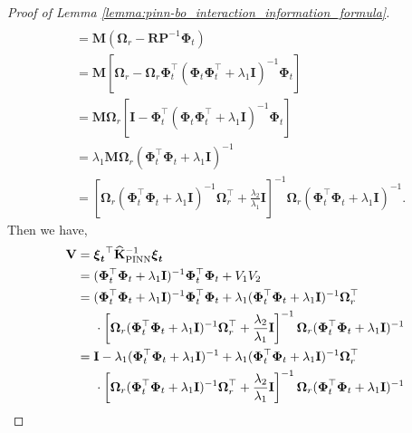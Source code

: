 \begin{proof}[Proof of Lemma \ref{lemma:pinn-bo_interaction_information_formula}]
\begin{align*}
\\
            & = \mathbf{M}(\boldsymbol{\Omega}_r - \mathbf{R}\mathbf{P}^{-1}\boldsymbol{\Phi}_t)
\\
            & = \mathbf{M}\left[\boldsymbol{\Omega}_r - \boldsymbol{\Omega}_r \boldsymbol{\Phi}_t^\top (\boldsymbol{\Phi}_t \boldsymbol{\Phi}_t^\top + \lambda_1\mathbf{I})^{-1}\boldsymbol{\Phi}_t\right] 
\\
            & = \mathbf{M}\boldsymbol{\Omega}_r \left[ \mathbf{I} - \boldsymbol{\Phi}_t^\top (\boldsymbol{\Phi}_t \boldsymbol{\Phi}_t^\top + \lambda_1\mathbf{I})^{-1}\boldsymbol{\Phi}_t\right]
\\
            & = \lambda_1 \mathbf{M} \boldsymbol{\Omega}_r (\boldsymbol{\Phi}_t^\top \boldsymbol{\Phi}_t + \lambda_1\mathbf{I})^{-1} 
\\ 
            & = \left[\boldsymbol{\Omega}_r(\boldsymbol{\Phi}_t^\top \boldsymbol{\Phi}_t+ \lambda_1\mathbf{I})^{-1}\boldsymbol{\Omega}_r^\top + \frac{\lambda_2} {\lambda_1} \mathbf{I}\right]^{-1} \boldsymbol{\Omega}_r (\boldsymbol{\Phi}_t^\top \boldsymbol{\Phi}_t + \lambda_1\mathbf{I})^{-1}.
\end{align*}
Then we have, 
    \begin{align*}
            \mathbf{V} &= \boldsymbol{\boldsymbol{\xi}_t}^\top \mathbf{\widehat{K}}_\mathrm{PINN}^{-1} \boldsymbol{\boldsymbol{\xi}_t}  
            \\
            & = (\boldsymbol{\Phi}_t^\top\boldsymbol{\Phi}_t+\lambda_1 \mathbf{I})^{-1} \boldsymbol{\Phi}_t^\top\boldsymbol{\Phi}_t + V_1V_2
            \\
            & = (\boldsymbol{\Phi}_t^\top\boldsymbol{\Phi}_t+\lambda_1 \mathbf{I})^{-1} \boldsymbol{\Phi}_t^\top\boldsymbol{\Phi}_t + \lambda_1(\boldsymbol{\Phi}_t^\top\boldsymbol{\Phi}_t + \lambda_1\mathbf{I})^{-1} \boldsymbol{\Omega}_r^\top \notag \\
            &  \;\;\;\;\; \cdot \left[\boldsymbol{\Omega}_r(\boldsymbol{\Phi}_t^\top \boldsymbol{\Phi}_t+ \lambda_1\mathbf{I})^{-1}\boldsymbol{\Omega}_r^\top + \frac{\lambda_2} {\lambda_1} \mathbf{I}\right]^{-1} \boldsymbol{\Omega}_r (\boldsymbol{\Phi}_t^\top \boldsymbol{\Phi}_t + \lambda_1\mathbf{I})^{-1} 
            \\
            &= \mathbf{I} - \lambda_1(\boldsymbol{\Phi}_t^\top\boldsymbol{\Phi}_t+\lambda_1 \mathbf{I})^{-1} + \lambda_1(\boldsymbol{\Phi}_t^\top\boldsymbol{\Phi}_t + \lambda_1\mathbf{I})^{-1} \boldsymbol{\Omega}_r^\top \notag \\
            & \;\;\;\;\;   \cdot \left[\boldsymbol{\Omega}_r(\boldsymbol{\Phi}_t^\top \boldsymbol{\Phi}_t+ \lambda_1\mathbf{I})^{-1}\boldsymbol{\Omega}_r^\top + \frac{\lambda_2} {\lambda_1} \mathbf{I}\right]^{-1} \boldsymbol{\Omega}_r (\boldsymbol{\Phi}_t^\top \boldsymbol{\Phi}_t + \lambda_1\mathbf{I})^{-1} 

\end{align*}
\end{proof}
